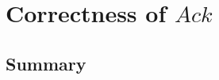 \chapter[$Ack$]{Correctness of $Ack$}\label{ch20}

\newpage
\section{Summary}\label{ch20.summary}

\ldefsummary %
\lthmsummary %
\lthmaddeddefsummary %
\lthmaddedthmsummary %
\lzevessummary %
